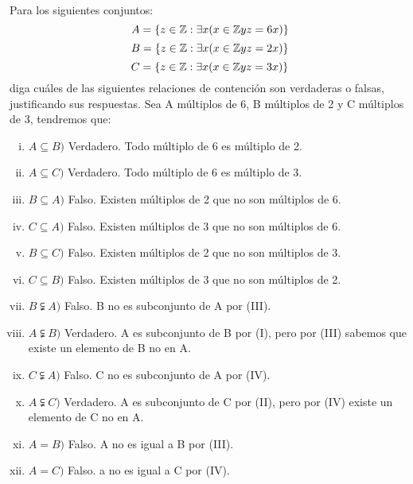 \section{}
Para los siguientes conjuntos: 
\[ A = \{z \in \mathbb{Z} : \exists x (x \in \mathbb{Z} y z = 6x) \}\]
\[ B = \{z \in \mathbb{Z} : \exists x (x \in \mathbb{Z} y z = 2x) \}\]
\[ C = \{z \in \mathbb{Z} : \exists x (x \in \mathbb{Z} y z = 3x) \}\]
diga cuáles de las siguientes relaciones de contención son verdaderas o falsas, justificando sus respuestas.
Sea A múltiplos de 6, B múltiplos de 2 y C múltiplos de 3, tendremos que:
\begin{enumerate}[(i)]
	\item $A \subseteq B)$  Verdadero. Todo múltiplo de 6 es múltiplo de 2.
	\item $A \subseteq C)$ Verdadero. Todo múltiplo de 6 es múltiplo de 3.
	\item $B \subseteq A)$ Falso. Existen múltiplos de 2 que no son múltiplos de 6.
	\item $C \subseteq A)$ Falso. Existen múltiplos de 3 que no son múltiplos de 6.
	\item $B \subseteq C)$ Falso. Existen múltiplos de 2 que no son múltiplos de 3.
	\item $C \subseteq B)$  Falso. Existen múltiplos de 3 que no son múltiplos de 2.
	\item $B \subsetneqq A)$ Falso. B no es subconjunto de A por (III).
	\item  $A \subsetneqq B)$ Verdadero. A es subconjunto de B por (I), pero por (III) sabemos que existe un elemento de B no en A.
	\item  $C \subsetneqq A)$ Falso. C no es subconjunto de A por  (IV).
	\item  $A \subsetneqq C)$ Verdadero. A es subconjunto de C por (II), pero por (IV) existe un elemento de C no en A.
	\item $A = B)$ Falso. A no es igual a B por (III).
	\item $A = C)$ Falso. a no es igual a C por (IV).
\end{enumerate}